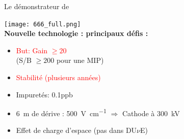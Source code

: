    \begin{frame}{Le démonstrateur de \SSS{}}
    	\begin{scriptsize}
                \centering
    			\texttt{[image: 666\_full.png]}\\
    			\vfill
    			\textbf{Nouvelle technologie : principaux défis :}\\
    			\begin{minipage}{0.32\textwidth}
    				\begin{itemize}
    					\item \textcolor{red}{But: Gain $\geq 20$} \\(S/B $\geq 200$ pour une MIP)
    					\item \textcolor{red}{Stabilité (plusieurs années)}
    				\end{itemize}
    			\end{minipage}\hfill
    			\begin{minipage}{0.32\textwidth}
    				\begin{itemize}
    					\item Impuretés: 0.1\;ppb
    					\item \SI{6}{\meter} de dérive : \SI{500}{\volt\per\centi\meter} $\Rightarrow$ Cathode à \SI{300}{\kilo\volt}
    				\end{itemize}
	    		\end{minipage}\hfill
	    		\begin{minipage}{0.32\textwidth}
	    			\begin{itemize}
    					\item[\danger] Effet de charge d'espace (pas dans DU$\nu$E)
	    			\end{itemize}
	    		\end{minipage}
    	\end{scriptsize} 
    \end{frame}

